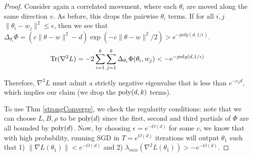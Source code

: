 \begin{proof}
Consider again a correlated movement, where each $\theta_i$ are moved along the same direction $v$. As before, this drops the pairwise $\theta_i$ terms. If for all $i, j$ $\| \theta_i - w_j \|^2 \leq \epsilon$, then we see that $\Delta_{\theta_i} \Phi = ( c\|\theta - w\|^2 -d ) \exp(-c\|\theta - w\|^2/2) > e^{-poly(d,1/\epsilon)}$. 
%
\[\operatorname{Tr}(\nabla^2 L) = -2\sum_{i=1}^k \sum_{j=1}^k \Delta_{\theta_i}\Phi(\theta_i, w_j) < -e^{-poly(d,1/\epsilon)}\]

Therefore, $\nabla^2 L$ must admit a strictly negative eigenvalue that
is less than $e^{-c_3 d}$, which implies our claim (we drop the
$\mathrm{poly}(d,k)$ terms).


To use Thm \ref{strongConverge}, we check the regularity conditions: note that we can choose $L, B, \rho$ to be $\mathrm{poly}(d)$ since the first, second and third partials of $\Phi$ are all bounded by $\mathrm{poly}(d)$. Now, by choosing $\epsilon = e^{-O(d)}$ for some $c$, we know that with high probability, running SGD in $T = e^{O(d)}$ iterations will output $\theta_1$ such that 1) $\|\nabla L (\theta_1)\| < e^{-O(d)}$ and 2) $\lambda_{min}(\nabla^2L(\theta_1)) > -e^{-O(d)}$.
\end{proof}


